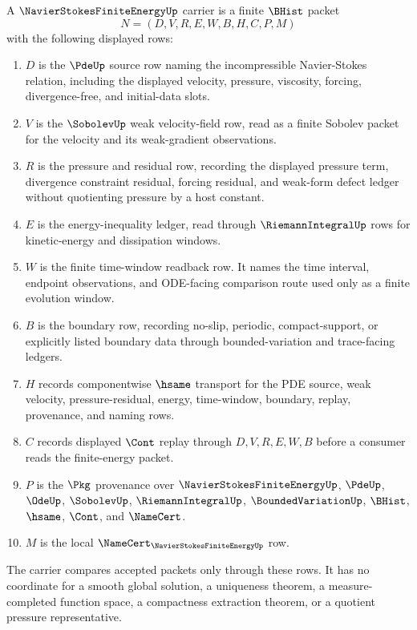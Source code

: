 \begin{definition}
\label{def:navier-stokes-finite-energy-carrier}
A $\NavierStokesFiniteEnergyUp$ carrier is a finite $\BHist$ packet
$$
N=(D,V,R,E,W,B,H,C,P,M)
$$
with the following displayed rows:
\begin{enumerate}
\item $D$ is the $\PdeUp$ source row naming the incompressible Navier-Stokes relation, including the displayed velocity, pressure, viscosity, forcing, divergence-free, and initial-data slots.
\item $V$ is the $\SobolevUp$ weak velocity-field row, read as a finite Sobolev packet for the velocity and its weak-gradient observations.
\item $R$ is the pressure and residual row, recording the displayed pressure term, divergence constraint residual, forcing residual, and weak-form defect ledger without quotienting pressure by a host constant.
\item $E$ is the energy-inequality ledger, read through $\RiemannIntegralUp$ rows for kinetic-energy and dissipation windows.
\item $W$ is the finite time-window readback row. It names the time interval, endpoint observations, and ODE-facing comparison route used only as a finite evolution window.
\item $B$ is the boundary row, recording no-slip, periodic, compact-support, or explicitly listed boundary data through bounded-variation and trace-facing ledgers.
\item $H$ records componentwise $\hsame$ transport for the PDE source, weak velocity, pressure-residual, energy, time-window, boundary, replay, provenance, and naming rows.
\item $C$ records displayed $\Cont$ replay through $D,V,R,E,W,B$ before a consumer reads the finite-energy packet.
\item $P$ is the $\Pkg$ provenance over $\NavierStokesFiniteEnergyUp$, $\PdeUp$, $\OdeUp$, $\SobolevUp$, $\RiemannIntegralUp$, $\BoundedVariationUp$, $\BHist$, $\hsame$, $\Cont$, and $\NameCert$.
\item $M$ is the local $\NameCert_{\NavierStokesFiniteEnergyUp}$ row.
\end{enumerate}
The carrier compares accepted packets only through these rows. It has no coordinate for a smooth global solution, a uniqueness theorem, a measure-completed function space, a compactness extraction theorem, or a quotient pressure representative.
\end{definition}

